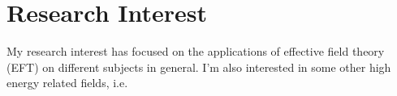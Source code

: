 
\section{Research Interest}

My research interest has focused on the applications of effective field theory (EFT) on different subjects in general. 
I'm also interested in some other high energy related fields, i.e.
